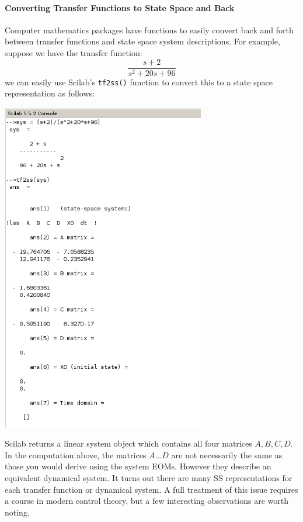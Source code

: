 \paragraph{Converting Transfer Functions to State Space and Back}
Computer mathematics packages have functions to easily convert back and forth between transfer functions and state space system descriptions.   For example, suppose we have the transfer function:
\[
\frac{s+2}{s^2+20s+96}
\]
we can easily use Scilab's {\tt tf2ss()} function
to convert this to a state space representation as follows:

\begin{center}
\includegraphics[width=3.5in]{figs04/tf2ss.png}
\end{center}

Scilab returns a linear system object which contains all four matrices $A,B,C,D$.  
In the computation above, the matrices $A \dots D$ are not necessarily the same as those you would
derive using the system EOMs.   However they describe an equivalent dynamical system.  It turns
out there are many SS representations for each transfer function or dynamical system. 
A full treatment of this issue requires a course in modern control theory, but a few interesting
 observations are worth noting. 
 
